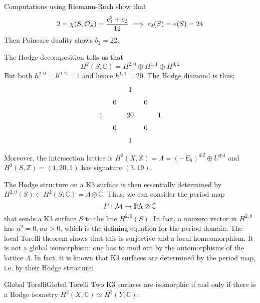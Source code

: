 Computations using Riemann-Roch show that $$2=\chi(S,\O_S)=\frac{c_1^2+c_2}{12}\implies c_2(S)=e(S)=24$$
Then Poincare duality shows $b_2=22$. 

The Hodge decomposition tells us that $$H^2(S,\mathbb{C})=H^{2,0}\oplus H^{1,1}\oplus H^{0,2}$$But both $h^{2,0}=h^{0,2}=1$ and hence $h^{1,1}=20$.  The Hodge diamond is thus: \[\begin{tikzcd}[row sep=tiny, column sep=tiny]
    &   & 1  &   &   \\
    & 0 &    & 0 &   \\
  1 &   & 20 &   & 1 \\
    & 0 &    & 0 &   \\
    &   & 1  &   &  
  \end{tikzcd}\]

Moreover, the intersection lattice is $H^2(X,\mathbb{X})=\Lambda=(-E_8)^{\oplus 2}\oplus U^{\oplus 3}$ and $H^2(S,\mathbb{Z})=(1,20,1)$ has signature $(3,19)$.

The Hodge structure on a K3 surface is then essentially determined by $H^{2,0}(S)\subset H^2(S;\mathbb{C})=\Lambda\otimes \mathbb{C}$. Thus, we can consider the period map $$P: \mathcal{M} \rightarrow \P \Lambda \otimes \mathbb{C}$$that sends a K3 surface $S$ to the line $H^{2,0}(S)$.  In fact, a nonzero vector in $H^{2,0}$ has $u^2=0, u \overline{u}>0$, which is the defining equation for the period domain. The local Torelli theorem shows that this is surjective and a local homeomorphism. It is not a global isomorphism: one has to mod out by the automorphisms of the lattice $\Lambda$. In fact, it is known that K3 surfaces are determined by the period map, i.e. by their Hodge structure:

\begin{theorem}{Global Torelli}{Global Torelli}
Two K3 surfaces are isomorphic if and only if there is a Hodge isometry $H^2(X,\mathbb{C})\simeq H^2(Y,\mathbb{C})$.
\end{theorem}


 

